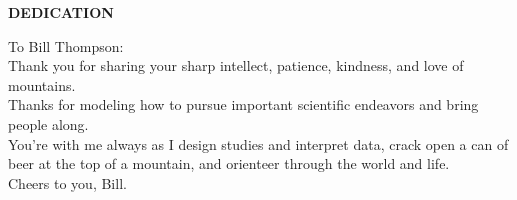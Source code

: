 
\clearpage

\clearpage\thispagestyle{empty}\mbox{}\clearpage 
\normalsize
\begin{center}
{\textbf{DEDICATION}}
\hspace{0pt}

To Bill Thompson: \\
Thank you for sharing your sharp intellect, patience, kindness, and love of mountains. \\
Thanks for modeling how to pursue important scientific endeavors and bring people along. \\ 
You're with me always as I design studies and interpret data, crack open a can of beer at the top of a mountain, and orienteer through the world and life. \\
Cheers to you, Bill. 

\begin{comment}
To the wild women in my life \\
who got off the speeding train \\ 
to nowhere \\
and are dancing on the platform and \\
throughout the grove -- \\
you know who you are. 
\vfill


\raggedright{i stand} \\
\raggedright{on the sacrifices} \\
\raggedright{of a million women before me} \\
\raggedright{thinking} \\
\raggedright{\textit{what can i do}} \\
\raggedright{\textit{to make this mountain taller}} \\
\raggedright{\textit{so the women after me}} \\
\raggedright{\textit{can see farther}} \\
\raggedright{\textit{- legacy}} \\
\raggedright{Rupi Kaur}

\vfill
\raggedright{There is a special place in hell for women who don't help other women.} \\
\raggedright{Madeleine Albright}
\vfill
\hspace{0pt}
\end{comment}

\end{center}

